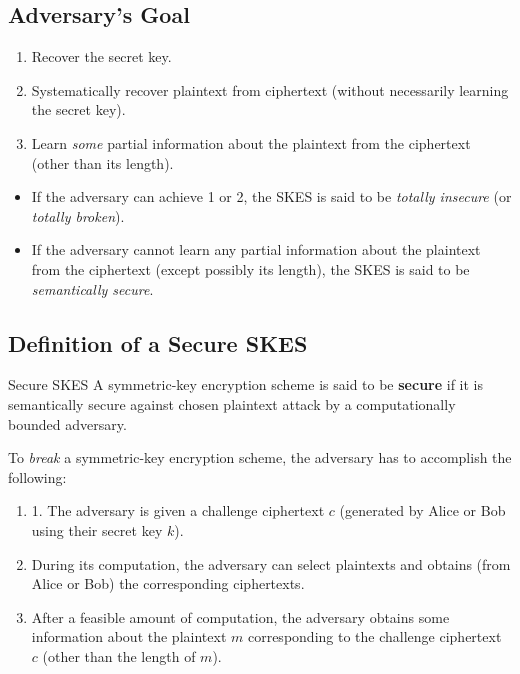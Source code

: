 \subsection*{Adversary's Goal}
\begin{enumerate}
      \item Recover the secret key.
      \item Systematically recover plaintext from
            ciphertext (without necessarily learning the secret key).
      \item Learn \emph{some} partial information about the plaintext
            from the ciphertext (other than its length).
\end{enumerate}
\begin{itemize}
      \item If the adversary can achieve 1 or 2,
            the SKES is said to be \emph{totally insecure} (or \emph{totally broken}).
      \item If the adversary cannot learn any partial information about
            the plaintext from the ciphertext (except possibly its length), the
            SKES is said to be \emph{semantically secure}.
\end{itemize}

\subsection*{Definition of a Secure SKES}
\begin{Definition}{Secure SKES}{}
      A symmetric-key
      encryption scheme is said to be \textbf{secure}
      if it is semantically secure against chosen
      plaintext attack by a computationally bounded adversary.
\end{Definition}

To \emph{break} a symmetric-key encryption scheme,
the adversary has to accomplish the following:
\begin{enumerate}
      \item 1. The adversary is given a challenge ciphertext
            $c$ (generated by Alice or Bob using their secret key $k$).
      \item During its computation, the adversary can select
            plaintexts and obtains (from Alice or Bob)
            the corresponding ciphertexts.
      \item After a feasible amount of computation, the adversary
            obtains some information about the plaintext $m$ corresponding
            to the challenge ciphertext $c$ (other than the length of $m$).
\end{enumerate}

